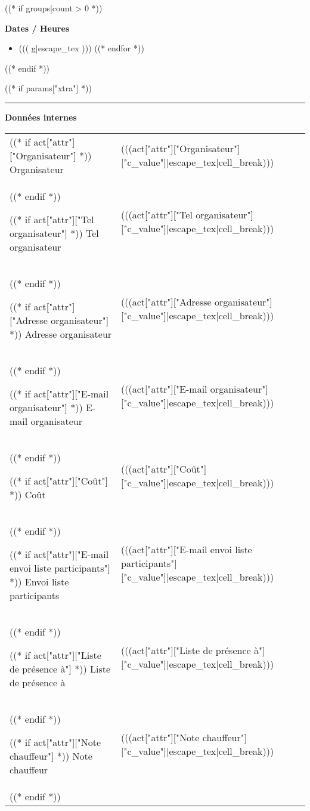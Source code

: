 \begin{minipage}[t]{\textwidth}
((* if groups|count > 0 *))

\medskip

\textbf{Dates / Heures}
\medskip

\begin{itemize}[noitemsep]
((* for g in groups *))
\item ((( g|escape_tex )))
((* endfor *))
\end{itemize}
((* endif *))

((* if params["xtra"] *))
\rule{\textwidth}{1pt}

\medskip

\textbf{Données internes}
\medskip

\begin{tabulary}{0.9\textwidth}{p{4cm}|L}
((* if act["attr"]["Organisateur"] *))
Organisateur & (((act["attr"]["Organisateur"]["c_value"]|escape_tex|cell_break))) \\
((* endif *))

((* if act["attr"]["Tel organisateur"] *))
Tel organisateur & (((act["attr"]["Tel organisateur"]["c_value"]|escape_tex|cell_break))) \\
((* endif *))

((* if act["attr"]["Adresse organisateur"] *))
Adresse organisateur & (((act["attr"]["Adresse organisateur"]["c_value"]|escape_tex|cell_break))) \\
((* endif *))

((* if act["attr"]["E-mail organisateur"] *))
E-mail organisateur & (((act["attr"]["E-mail organisateur"]["c_value"]|escape_tex|cell_break))) \\
((* endif *))

((* if act["attr"]["Coût"] *))
Coût & (((act["attr"]["Coût"]["c_value"]|escape_tex|cell_break))) \\
((* endif *))

((* if act["attr"]["E-mail envoi liste participants"] *))
Envoi liste participants & (((act["attr"]["E-mail envoi liste participants"]["c_value"]|escape_tex|cell_break))) \\
((* endif *))

((* if act["attr"]["Liste de présence à"] *))
Liste de présence à & (((act["attr"]["Liste de présence à"]["c_value"]|escape_tex|cell_break))) \\
((* endif *))

((* if act["attr"]["Note chauffeur"] *))
Note chauffeur & (((act["attr"]["Note chauffeur"]["c_value"]|escape_tex|cell_break))) \\
((* endif *))


\end{tabulary}
\end{minipage}
